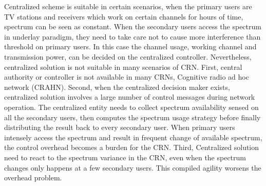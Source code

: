 Centralized scheme is suitable in certain scenarios, \eg when the primary users are TV stations and receivers which work on certain channels for hours of time, spectrum can be seen as constant. 
When the secondary users access the spectrum in underlay paradigm, they need to take care not to cause more interference than threshold on primary users.
In this case the channel usage, \ie working channel and transmission power, can be decided on the centralized controller.
%
Nevertheless, centralized solution is not suitable in many scenarios of CRN.
First, central authority or controller is not available in many CRNs, \eg Cognitive radio ad hoc network (\gls{CRAHN}).
Second, when the centralized decision maker exists, centralized solution involves a large number of control messages during network operation.
The centralized entity needs to collect spectrum availability sensed on all the secondary users, then computes the spectrum usage strategy before finally distributing the result back to every secondary user.
When primary users intensely access the spectrum and result in frequent change of available spectrum, the control overhead becomes a burden for the CRN.
Third, Centralized solution need to react to the spectrum variance in the CRN, even when the spectrum changes only happens at a few secondary users.
This compiled agility worsens the overhead problem.






